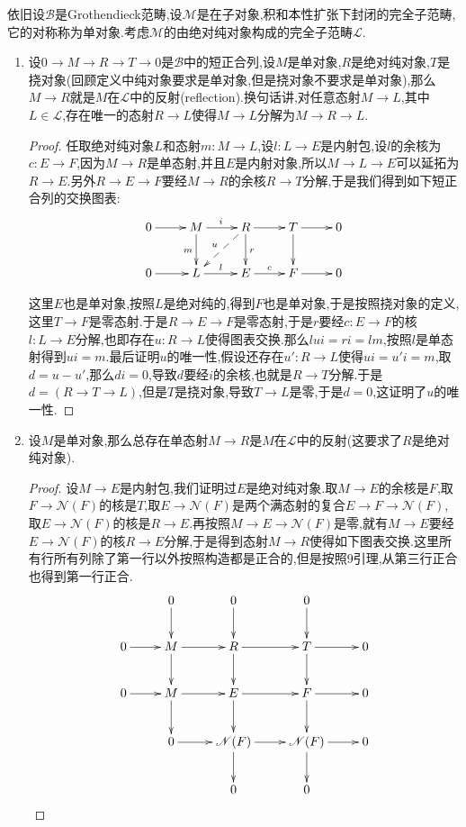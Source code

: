 依旧设$\mathscr{B}$是Grothendieck范畴,设$\mathscr{M}$是在子对象,积和本性扩张下封闭的完全子范畴,它的对称称为单对象.考虑$\mathscr{M}$的由绝对纯对象构成的完全子范畴$\mathscr{L}$.
\begin{enumerate}
	\item 设$0\to M\to R\to T\to0$是$\mathscr{B}$中的短正合列,设$M$是单对象,$R$是绝对纯对象,$T$是挠对象(回顾定义中纯对象要求是单对象,但是挠对象不要求是单对象),那么$M\to R$就是$M$在$\mathscr{L}$中的反射(reflection).换句话讲,对任意态射$M\to L$,其中$L\in\mathscr{L}$,存在唯一的态射$R\to L$使得$M\to L$分解为$M\to R\to L$.
	\begin{proof}
		
		任取绝对纯对象$L$和态射$m:M\to L$,设$l:L\to E$是内射包,设$l$的余核为$c:E\to F$,因为$M\to R$是单态射,并且$E$是内射对象,所以$M\to L\to E$可以延拓为$R\to E$.另外$R\to E\to F$要经$M\to R$的余核$R\to T$分解,于是我们得到如下短正合列的交换图表:
		$$\xymatrix{0\ar[r]&M\ar[r]^i\ar[d]_m&R\ar[r]\ar@{-->}[dl]_u\ar[d]^r&T\ar[r]\ar[d]&0\\0\ar[r]&L\ar[r]^l&E\ar[r]^c&F\ar[r]&0}$$
		
		这里$E$也是单对象,按照$L$是绝对纯的,得到$F$也是单对象,于是按照挠对象的定义,这里$T\to F$是零态射.于是$R\to E\to F$是零态射,于是$r$要经$c:E\to F$的核$l:L\to E$分解,也即存在$u:R\to L$使得图表交换.那么$lui=ri=lm$,按照$l$是单态射得到$ui=m$.最后证明$u$的唯一性,假设还存在$u':R\to L$使得$ui=u'i=m$,取$d=u-u'$,那么$di=0$,导致$d$要经$i$的余核,也就是$R\to T$分解.于是$d=\left(R\to T\to L\right)$,但是$T$是挠对象,导致$T\to L$是零,于是$d=0$,这证明了$u$的唯一性.
	\end{proof}
    \item 设$M$是单对象,那么总存在单态射$M\to R$是$M$在$\mathscr{L}$中的反射(这要求了$R$是绝对纯对象).
    \begin{proof}
    	
    	设$M\to E$是内射包,我们证明过$E$是绝对纯对象.取$M\to E$的余核是$F$,取$F\to\mathscr{N}(F)$的核是$T$,取$E\to\mathscr{N}(F)$是两个满态射的复合$E\to F\to\mathscr{N}(F)$,取$E\to\mathscr{N}(F)$的核是$R\to E$.再按照$M\to E\to\mathscr{N}(F)$是零,就有$M\to E$要经$E\to\mathscr{N}(F)$的核$R\to E$分解,于是得到态射$M\to R$使得如下图表交换.这里所有行所有列除了第一行以外按照构造都是正合的,但是按照9引理,从第三行正合也得到第一行正合.
    	$$\xymatrix{&0\ar[d]&0\ar[d]&0\ar[d]&\\0\ar[r]&M\ar[r]\ar[d]&R\ar[r]\ar[d]&T\ar[r]\ar[d]&0\\0\ar[r]&M\ar[r]\ar[d]&E\ar[r]\ar[d]&F\ar[r]\ar[d]&0\\&0\ar[r]&\mathscr{N}(F)\ar[r]\ar[d]&\mathscr{N}(F)\ar[r]\ar[d]&0\\&&0&0&}$$
    	

\end{proof}
\end{enumerate}
